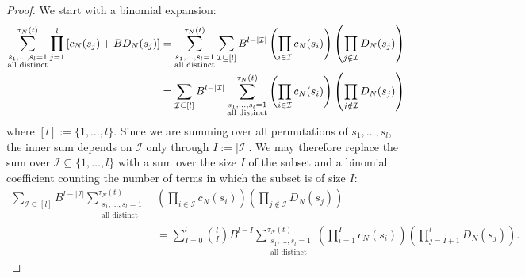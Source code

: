 \begin{proof}
We start with a binomial expansion:
\begin{align}
\sum_{\substack{ s_1, \dots, s_l =1 \\ \text{all distinct} }}^{\tau_N(t)} 
        \prod_{j=1}^l \left[ c_N(s_j) + B D_N(s_j) \right]
&= \sum_{\substack{ s_1, \dots, s_l =1 \\ \text{all distinct} }}^{\tau_N(t)} 
        \sum_{\mathcal{I} \subseteq [l]}
        B^{l-|\mathcal{I}|} \left( \prod_{i\in\mathcal{I}} c_N(s_i) \right)
        \left( \prod_{j\notin\mathcal{I}} D_N(s_j) \right) \notag\\
&= \sum_{\mathcal{I} \subseteq [l]} B^{l-|\mathcal{I}|}
        \sum_{\substack{ s_1, \dots, s_l =1 \\ \text{all distinct} }}^{\tau_N(t)}
        \left( \prod_{i\in\mathcal{I}} c_N(s_i) \right)
        \left( \prod_{j\notin\mathcal{I}} D_N(s_j) \right) \label{eq:010}
\end{align}
where $[l] := \{1,\dots,l\}$. 
Since we are summing over all permutations of $s_1,\dots,s_l$, the inner sum depends on $\mathcal{I}$ only through $I:= |\mathcal{I}|$. We may therefore replace the sum over $\mathcal{I} \subseteq \{1,\dots,l\}$ with a sum over the size $I$ of the subset and a binomial coefficient counting the number of terms in which the subset is of size $I$:
\begin{align*}
\sum_{\mathcal{I} \subseteq [l]} B^{l-|\mathcal{I}|}
        \sum_{\substack{ s_1, \dots, s_l =1 \\ \text{all distinct} }}^{\tau_N(t)}
        &\left( \prod_{i\in\mathcal{I}} c_N(s_i) \right)
        \left( \prod_{j\notin\mathcal{I}} D_N(s_j) \right) \\
&= \sum_{I=0}^l \binom{l}{I} B^{l-I} 
        \sum_{\substack{ s_1, \dots, s_l =1 \\ \text{all distinct} }}^{\tau_N(t)}
        \left( \prod_{i=1}^I c_N(s_i) \right)
        \left( \prod_{j=I+1}^l D_N(s_j) \right) .
\end{align*}

\end{proof}
